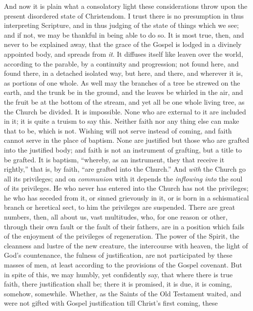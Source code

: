 And now it is plain what a consolatory light these considerations
throw upon the present disordered state of Christendom. I trust there
is no presumption in thus interpreting Scripture, and in thus judging
of the state of things which we see; and if not, we may be thankful in
being able to do so. It is most true, then, and never to be explained
away, that the grace of the Gospel is lodged in a divinely appointed
body, and spreads from \emph{it}. It diffuses itself like leaven over
the world, according to the parable, by a continuity and progression;
not found here, and found there, in a detached isolated way, but here,
and there, and wherever it is, as portions of one whole. As well may
the branches of a tree be strewed on the earth, and the trunk be in
the ground, and the leaves be whirled in the air, and the fruit be at
the bottom of the stream, and yet all be one whole living tree, as the
Church be divided. It is impossible. None who are external to it are
included in it; it is quite a truism to say this. Neither faith nor
any thing else can make that to be, which is not. Wishing will not
serve instead of coming, and faith cannot serve in the place of
baptism. None are justified but those who are grafted into the
justified body; and faith is not an instrument of grafting, but a
title to be grafted. It is baptism, ``whereby, as an instrument,
they that receive it rightly,'' that is, by faith, ``are
grafted into the Church.'' And \emph{with} the Church go all its
privileges; and on \emph{communion} with it depends the \emph{inflowing
into} the soul of its privileges. He who never has entered into the
Church has not the privileges; he who has seceded from it, or sinned
grievously in it, or is born in a schismatical branch or heretical
sect, to him the privileges are suspended. There are great numbers,
then, all about us, vast multitudes, who, for one reason or other,
through their own fault or the fault of their fathers, are in a
position which fails of the enjoyment of the privileges of
regeneration. The power of the Spirit, the cleanness and lustre of the
new creature, the intercourse with heaven, the light of God's
countenance, the fulness of justification, are not participated by
these masses of men, at least according to the provisions of the
Gospel covenant. But in spite of this, we may humbly, yet confidently
say, that where there is true faith, there justification shall be;
there it is promised, it is due, it is coming, somehow, somewhile.
Whether, as the Saints of the Old Testament waited, and were not
gifted with Gospel justification till Christ's first coming, these
